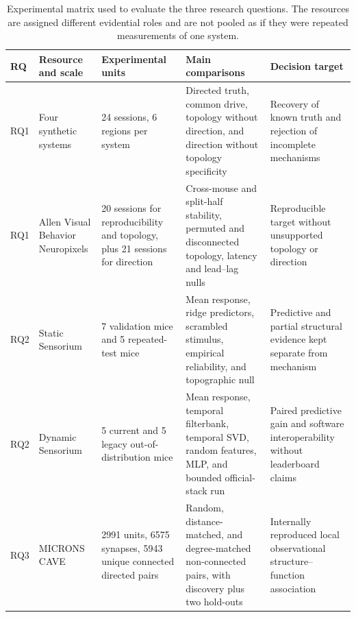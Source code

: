\begin{table}[t]
\centering
\caption{Experimental matrix used to evaluate the three research questions. The
resources are assigned different evidential roles and are not pooled as if they
were repeated measurements of one system.}
\label{tab:experimental-matrix}
\scriptsize
\begin{tabularx}{\textwidth}{@{}p{0.8cm}p{2.6cm}p{2.7cm}X X@{}}
\toprule
RQ & Resource and scale & Experimental units & Main comparisons & Decision target \\
\midrule
RQ1 & Four synthetic systems & 24 sessions, 6 regions per system & Directed truth, common drive, topology without direction, and direction without topology specificity & Recovery of known truth and rejection of incomplete mechanisms \\
RQ1 & Allen Visual Behavior Neuropixels & 20 sessions for reproducibility and topology, plus 21 sessions for direction & Cross-mouse and split-half stability, permuted and disconnected topology, latency and lead--lag nulls & Reproducible target without unsupported topology or direction \\
RQ2 & Static Sensorium & 7 validation mice and 5 repeated-test mice & Mean response, ridge predictors, scrambled stimulus, empirical reliability, and topographic null & Predictive and partial structural evidence kept separate from mechanism \\
RQ2 & Dynamic Sensorium & 5 current and 5 legacy out-of-distribution mice & Mean response, temporal filterbank, temporal SVD, random features, MLP, and bounded official-stack run & Paired predictive gain and software interoperability without leaderboard claims \\
RQ3 & MICRONS CAVE & 2991 units, 6575 synapses, 5943 unique connected directed pairs & Random, distance-matched, and degree-matched non-connected pairs, with discovery plus two hold-outs & Internally reproduced local observational structure--function association \\
\bottomrule
\end{tabularx}
\end{table}
